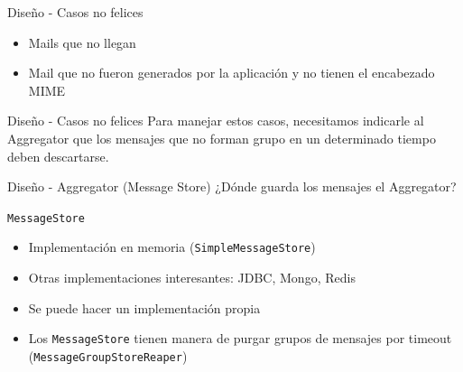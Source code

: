 \documentclass{beamer}
\begin{document}

\begin{frame}{Diseño - Casos no felices}
\begin{itemize}
\item Mails que no llegan
\item Mail que no fueron generados por la aplicación y no tienen el encabezado MIME
\end{itemize}
\end{frame}

\begin{frame}{Diseño - Casos no felices}
Para manejar estos casos, necesitamos indicarle al Aggregator que los mensajes que no forman grupo en un determinado tiempo deben descartarse.
\end{frame}

\begin{frame}[fragile]{Diseño - Aggregator (Message Store)}
¿Dónde guarda los mensajes el Aggregator?
\pause
\begin{center}
\verb|MessageStore|
\end{center}
\begin{itemize}[<+->]
\item Implementación en memoria (\verb|SimpleMessageStore|)
\item Otras implementaciones interesantes: JDBC, Mongo, Redis
\item Se puede hacer un implementación propia
\item Los \verb|MessageStore| tienen manera de purgar grupos de mensajes por timeout (\verb|MessageGroupStoreReaper|)
\end{itemize}
\end{frame}
\end{document}
